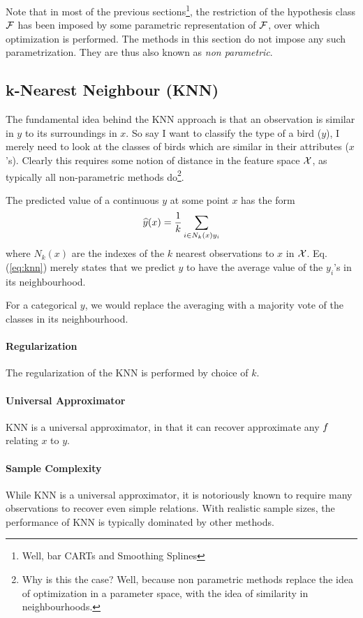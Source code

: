 Note that in most of the previous sections\footnote{Well, bar CARTs and Smoothing Splines}, the restriction of the hypothesis class $\mathcal{F}$ has been imposed by some parametric representation of $\mathcal{F}$, over which optimization is performed.
The methods in this section do not impose any such parametrization. They are thus also known as \emph{non parametric}.

 

\subsection{k-Nearest Neighbour (KNN)}
\label{sec:knn}
The fundamental idea behind the KNN approach is that an observation is similar in $y$ to its surroundings in $x$. 
So say I want to classify the type of a bird ($y$), I merely need to look at the classes of birds which are similar in their attributes ($x$'s). 
Clearly this requires some notion of distance in the feature space $\mathcal{X}$, as typically all non-parametric methods do\footnote{Why is this the case? Well, because non parametric methods replace the idea of optimization in a parameter space, with the idea of similarity in neighbourhoods.}.

The predicted value of a continuous $y$ at some point $x$ has the form
\begin{align}
\label{eq:knn}
	\widehat{y}(x)=\frac{1}{k}\sum_{i \in N_k(x) y_i}
\end{align}
where $N_k(x)$ are the indexes of the $k$ nearest observations to $x$ in $\mathcal{X}$.
Eq.(\ref{eq:knn}) merely states that we predict $y$ to have the average value of the $y_i$'s in its neighbourhood.

For a categorical $y$, we would replace the averaging with a majority vote of the classes in its neighbourhood.

\paragraph{Regularization}
The regularization of the KNN is performed by choice of $k$.

\paragraph{Universal Approximator}
KNN is a universal approximator, in that it can recover approximate any $f$ relating $x$ to $y$.

\paragraph{Sample Complexity}
While KNN is a universal approximator, it is notoriously known to require many observations to recover even simple relations. With realistic sample sizes, the performance of KNN is typically dominated by other methods.





